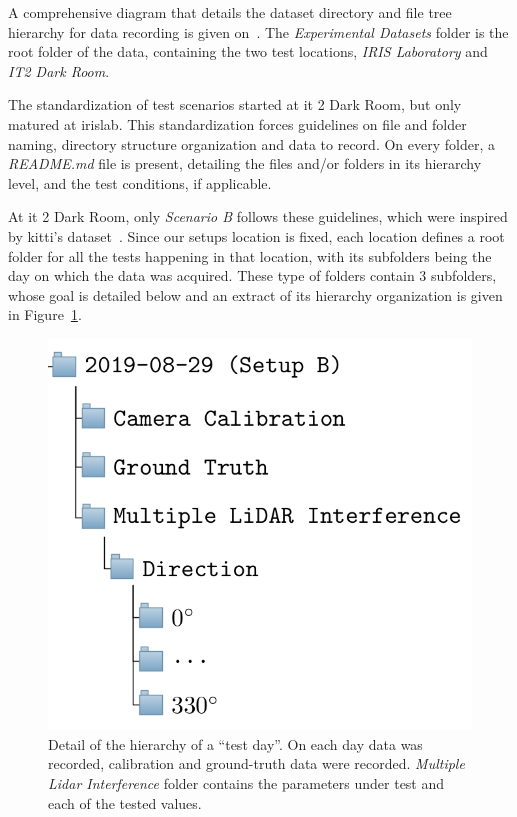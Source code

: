 A comprehensive diagram that details the dataset directory and file tree hierarchy for data recording is given on~. The \textit{Experimental Datasets} folder is the root folder of the data, containing the two test locations, \textit{IRIS Laboratory} and \textit{IT2 Dark Room}. 

The standardization of test scenarios started at \ac{it} 2 Dark Room, but only matured at \ac{irislab}. This standardization forces guidelines on file and folder naming, directory structure organization and data to record. On every folder, a \textit{README.md} file is present, detailing the files and/or folders in its hierarchy level, and the test conditions, if applicable. 

At \ac{it} 2 Dark Room, only \textit{Scenario B} follows these guidelines, which were inspired by \ac{kitti}'s dataset~\cite{Geiger2013a}. Since our setups location is fixed, each location defines a root folder for all the tests happening in that location, with its subfolders being the day on which the data was acquired. These type of folders contain  3 subfolders, whose goal is detailed below and an extract of its  hierarchy organization is given in Figure~\ref{fig:test-subfolders}.

\begin{figure}[!ht]
\centering
\includegraphics[scale=0.3]{img/datasets/test-subfolders.png}
\caption[Dataset folder hierarchy for a ``test day''.]{Detail of the hierarchy of a ``test day''. On each day data was recorded, calibration and ground-truth data were recorded. \textit{Multiple Lidar Interference} folder contains the parameters under test and each of the tested values.}
\label{fig:test-subfolders}
\end{figure}


